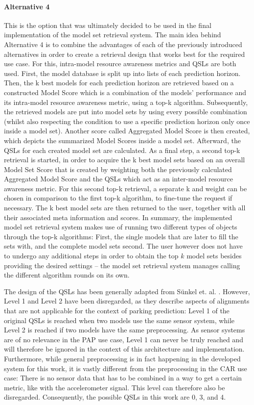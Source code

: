\paragraph{Alternative 4}
This is the option that was ultimately decided to be used in the final implementation of the model set retrieval system. The main idea behind Alternative 4 is to combine the advantages of each of the previously introduced alternatives in order to create a retrieval design that works best for the required use case. For this, intra-model resource awareness metrics and QSLs are both used. First, the model database is split up into lists of each prediction horizon. Then, the k best models for each prediction horizon are retrieved based on a constructed Model Score which is a combination of the models’ performance and its intra-model resource awareness metric, using a top-k algorithm. Subsequently, the retrieved models are put into model sets by using every possible combination (whilst also respecting the condition to use a specific prediction horizon only once inside a model set). Another score called Aggregated Model Score is then created, which depicts the summarized Model Scores inside a model set. Afterward, the QSLs for each created model set are calculated. As a final step, a second top-k retrieval is started, in order to acquire the k best model sets based on an overall Model Set Score that is created by weighting both the previously calculated Aggregated Model Score and the QSLs which act as an inter-model resource awareness metric. For this second top-k retrieval, a separate k and weight can be chosen in comparison to the first top-k algorithm, to fine-tune the request if necessary. The k best model sets are then returned to the user, together with all their associated meta information and scores. In summary, the implemented model set retrieval system makes use of running two different types of objects through the top-k algorithms: First, the single models that are later to fill the sets with, and the complete model sets second. The user however does not have to undergo any additional steps in order to obtain the top $k$ model sets besides providing the desired settings – the model set retrieval system manages calling the different algorithm rounds on its own.

The design of the QSLs has been generally adapted from Sünkel et. al. \cite{sunkel2022}. However, Level 1 and Level 2 have been disregarded, as they describe aspects of alignments that are not applicable for the context of parking prediction: Level 1 of the original QSLs is reached when two models use the same sensor system, while Level 2 is reached if two models have the same preprocessing. As sensor systems are of no relevance in the PAP use case, Level 1 can never be truly reached and will therefore be ignored in the context of this architecture and implementation. Furthermore, while general preprocessing is in fact happening in the developed system for this work, it is vastly different from the preprocessing in the CAR use case: There is no sensor data that has to be combined in a way to get a certain metric, like with the accelerometer signal. This level can therefore also be disregarded. Consequently, the possible QSLs in this work are 0, 3, and 4.


